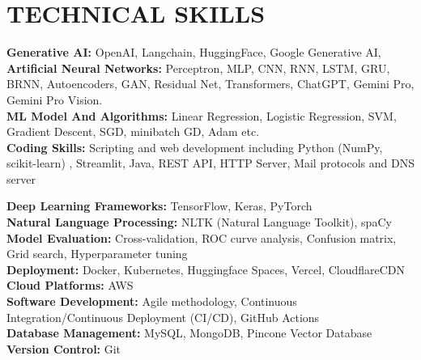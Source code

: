 \documentclass[letterpaper,11pt]{article}
\begin{document}
\section{TECHNICAL SKILLS}
\begin{itemize}[leftmargin=0.15in, label={}]
    \small{
    \item{
        
        \textbf{Generative AI:} OpenAI, Langchain, HuggingFace, Google Generative AI, \\
        \vspace{0.15cm}
        \textbf{Artificial Neural Networks:} Perceptron, MLP, CNN, RNN, LSTM, GRU, BRNN, Autoencoders, GAN, Residual Net, Transformers, ChatGPT, Gemini Pro, Gemini Pro Vision.  \\
        \vspace{0.15cm}
        \textbf{ML Model And Algorithms:} Linear Regression, Logistic Regression, SVM, Gradient Descent, SGD, minibatch GD, Adam etc. \\
        \vspace{0.15cm}
        \textbf{Coding Skills:} Scripting and web development including Python (NumPy, scikit-learn) , Streamlit, Java, REST API, HTTP Server, Mail protocols and DNS server \\
        \vspace{0.15cm}

        \textbf{Deep Learning Frameworks:} TensorFlow, Keras, PyTorch \\
        \vspace{0.15cm}
        \textbf{Natural Language Processing:} NLTK (Natural Language Toolkit), spaCy \\
        \vspace{0.15cm}
        \textbf{Model Evaluation:} Cross-validation, ROC curve analysis, Confusion matrix, Grid search, Hyperparameter tuning \\
        \vspace{0.15cm}
        \textbf{Deployment:} Docker, Kubernetes, Huggingface Spaces, Vercel, CloudflareCDN \\
        \vspace{0.15cm}
        \textbf{Cloud Platforms:} AWS \\
        \vspace{0.15cm}
        \textbf{Software Development:} Agile methodology, Continuous Integration/Continuous Deployment (CI/CD), GitHub Actions \\
        \vspace{0.15cm}
        \textbf{Database Management:} MySQL, MongoDB, Pincone Vector Database \\
        \vspace{0.15cm}
        \textbf{Version Control:} Git \\
        \vspace{0.15cm}
    }
    }
\end{itemize}
\end{document}
